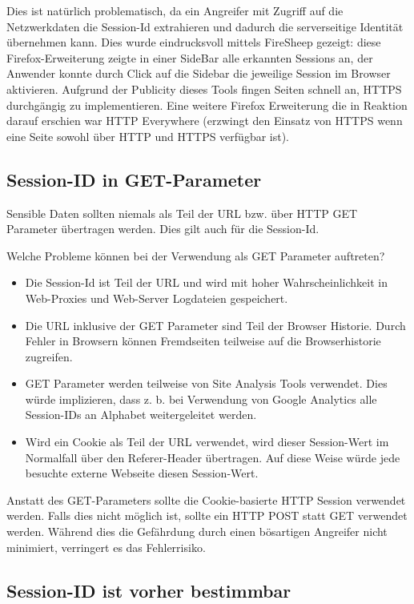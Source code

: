 Dies ist natürlich problematisch, da ein Angreifer mit Zugriff auf die Netzwerkdaten die Session-Id extrahieren und dadurch die serverseitige Identität übernehmen kann. Dies wurde eindrucksvoll mittels FireSheep gezeigt: diese Firefox-Erweiterung zeigte in einer SideBar alle erkannten Sessions an, der Anwender konnte durch Click auf die Sidebar die jeweilige Session im Browser aktivieren. Aufgrund der Publicity dieses Tools fingen Seiten schnell an, HTTPS durchgängig zu implementieren. Eine weitere Firefox Erweiterung die in Reaktion darauf erschien war HTTP Everywhere (erzwingt den Einsatz von HTTPS wenn eine Seite sowohl über HTTP und HTTPS verfügbar ist).


\subsection{Session-ID in GET-Parameter}

Sensible Daten sollten niemals als Teil der URL bzw. über HTTP GET Parameter übertragen werden. Dies gilt auch für die Session-Id.

Welche Probleme können bei der Verwendung als GET Parameter auftreten?

\begin{itemize}
	\item Die Session-Id ist Teil der URL und wird mit hoher Wahrscheinlichkeit in Web-Proxies und Web-Server Logdateien gespeichert.
	\item Die URL inklusive der GET Parameter sind Teil der Browser Historie. Durch Fehler in Browsern können Fremdseiten teilweise auf die Browserhistorie zugreifen.
	\item GET Parameter werden teilweise von Site Analysis Tools verwendet. Dies würde implizieren, dass z. b. bei Verwendung von Google Analytics alle Session-IDs an Alphabet weitergeleitet werden.
	\item Wird ein Cookie als Teil der URL verwendet, wird dieser Session-Wert im Normalfall über den Referer-Header übertragen. Auf diese Weise würde jede besuchte externe Webseite diesen Session-Wert.
\end{itemize}

Anstatt des GET-Parameters sollte die Cookie-basierte HTTP Session verwendet werden. Falls dies nicht möglich ist, sollte ein HTTP POST statt GET verwendet werden. Während dies die Gefährdung durch einen bösartigen Angreifer nicht minimiert, verringert es das Fehlerrisiko.

\subsection{Session-ID ist vorher bestimmbar}

